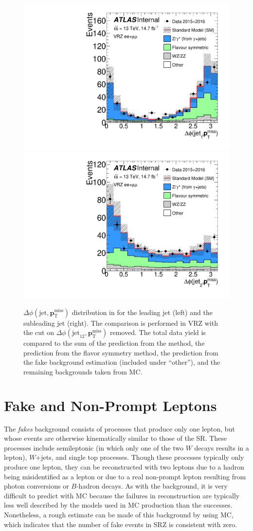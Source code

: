 \begin{centering}
\begin{figure}[!hbt]
\myfloatalign
\includegraphics[width=.45\linewidth]{figures/photons/METJetLeading_azmet_ee+mm_onz_VR.pdf}
\includegraphics[width=.45\linewidth]{figures/photons/METJetSecond_azmet_ee+mm_onz_VR.pdf}
\caption{ $\Delta\phi(\text{jet},{\boldsymbol p}_{\mathrm{T}}^\mathrm{miss})$ distribution in for the leading jet (left) and the subleading jet (right). The comparison is performed in VRZ with the cut on $\Delta\phi(\text{jet}_{12},{\boldsymbol p}_{\mathrm{T}}^\mathrm{miss})$ removed.  The total data yield is compared to the sum of the prediction from the \gjets method, the prediction from the flavor symmetry method, the prediction from the fake background estimation (included under ``other''), and the remaining backgrounds taken from \ac{MC}.}
\label{fig:photon_dphi}
\end{figure}
\end{centering}


\section{Fake and Non-Prompt Leptons}
\label{sec:bg-fake}

The \textit{fakes} background consists of processes that produce only one lepton, but whose events are otherwise kinematically similar to those of the \ac{SR}. These processes include semileptonic \ttbar (in which only one of the two $W$ decays results in a lepton), $W$+jets, and single top processes. Though these processes typically only produce one lepton, they can be reconstructed with two leptons due to a hadron being misidentified as a lepton or due to a real non-prompt lepton resulting from photon conversions or $B$-hadron decays. As with the \dyjets background, it is very difficult to predict with \ac{MC} because the failures in reconstruction are typically less well described by the models used in \ac{MC} production than the successes. Nonetheless, a rough estimate can be made of this background by using \ac{MC}, which indicates that the number of fake events in SRZ is consistent with zero. 

